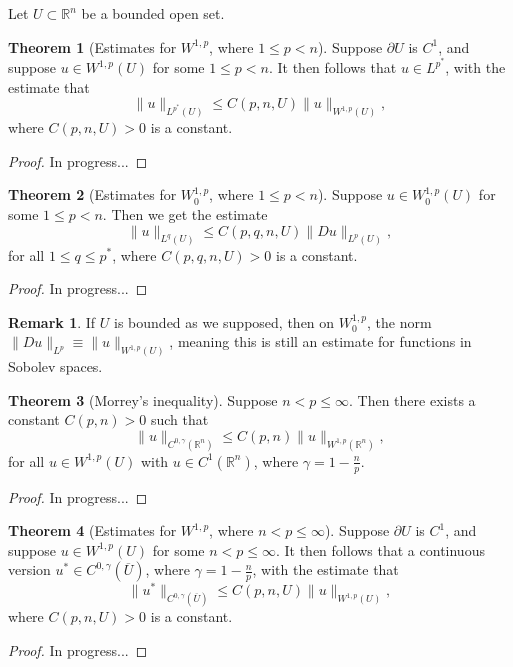 \documentclass[11pt]{article}
\theoremstyle{definition}
\newtheorem*{theorem}{Theorem}
\newtheorem*{remark}{Remark}
\begin{document}
Let $U \subset \mathbb{R}^n$ be a bounded open set.
\begin{theorem}[Estimates for $W^{1,p}$, where $1 \leq p < n$]
Suppose $\partial U$ is $C^1$,
and suppose $u \in W^{1,p}(U)$ for some $1 \leq p < n$. It then follows that $u \in L^{p^*}$, with the estimate that
	\[\|u\|_{L^{p^*}(U)} \leq C(p,n,U)\|u\|_{W^{1,p}(U)},\]
where $C(p,n,U) > 0$ is a constant.
\end{theorem}
\begin{proof}
In progress...
\end{proof}

\begin{theorem}[Estimates for $W_{0}^{1,p}$, where $1 \leq p < n$]
	Suppose $u \in W_{0}^{1,p}(U)$ for some $1 \leq p < n$. Then we get the estimate
	\[\|u\|_{L^{q}(U)} \leq C(p,q,n,U)\|Du\|_{L^{p}(U)},\]
	for all $1 \leq q \leq p^*$, where $C(p,q,n,U) > 0$ is a constant.
\end{theorem}
\begin{proof}
In progress...
\end{proof}

\begin{remark}
If $U$ is bounded as we supposed, then on $W_{0}^{1,p}$, the norm $\|Du\|_{L^{p}} \equiv \|u\|_{W^{1,p}(U)}$,
meaning this is still an estimate for functions in Sobolev spaces.
\end{remark}

\begin{theorem}[Morrey's inequality]
Suppose $n < p \leq \infty$. Then there exists a constant $C(p,n) > 0$ such that
	\[\|u\|_{C^{0,\gamma}(\mathbb{R}^n)} \leq C(p,n)\|u\|_{W^{1,p}(\mathbb{R}^n)},\]
for all $u \in W^{1,p}(U)$ with $u \in C^1(\mathbb{R}^n)$, where $\gamma = 1 - \frac{n}{p}$.
\end{theorem}
\begin{proof}
In progress...
\end{proof}

\begin{theorem}[Estimates for $W^{1,p}$, where $n < p \leq \infty$]
Suppose $\partial U$ is $C^1$,
	and suppose $u \in W^{1,p}(U)$ for some $n < p \leq \infty$. It then follows that a continuous version $u^* \in C^{0,\gamma}(\overline{U})$,
where $\gamma = 1 - \frac{n}{p}$, with the estimate that
	\[\|u^*\|_{C^{0,\gamma}(\overline{U})} \leq C(p,n,U)\|u\|_{W^{1,p}(U)},\]
where $C(p,n,U) > 0$ is a constant.
\end{theorem}
\begin{proof}
In progress...
\end{proof}
\end{document}
